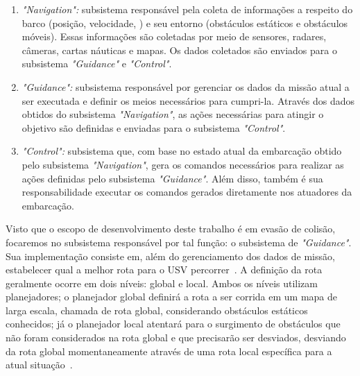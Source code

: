         \begin{enumerate}
            \item \textit{"Navigation":} subsistema responsável pela coleta de informações a respeito do barco (posição, velocidade, \etc) e seu entorno (obstáculos estáticos e obstáculos móveis). Essas informações são coletadas por meio de sensores, radares, câmeras, cartas náuticas e mapas. Os dados coletados são enviados para o subsistema \textit{"Guidance"} e \textit{"Control"}.
            
            \item \textit{"Guidance":} subsistema responsável por gerenciar os dados da missão atual a ser executada e definir os meios necessários para cumpri-la. Através dos dados obtidos do subsistema \textit{"Navigation"}, as ações necessárias para atingir o objetivo são definidas e enviadas para o subsistema \textit{"Control"}.
            
            \item \textit{"Control":} subsistema que, com base no estado atual da embarcação obtido pelo subsistema \textit{"Navigation"}, gera os comandos necessários para realizar as ações definidas pelo subsistema \textit{"Guidance"}. Além disso, também é sua responsabilidade executar os comandos gerados diretamente nos atuadores da embarcação.
        \end{enumerate}
        
        Visto que o escopo de desenvolvimento deste trabalho é em evasão de colisão, focaremos no subsistema responsável por tal função: o subsistema de \textit{"Guidance"}. Sua implementação consiste em, além do gerenciamento dos dados de missão, estabelecer qual a melhor rota para o USV percorrer~\cite{Jurak2020COLREGS}. A definição da rota geralmente ocorre em dois níveis: global e local. Ambos os níveis utilizam planejadores; o planejador global definirá a rota a ser corrida em um mapa de larga escala, chamada de rota global, considerando obstáculos estáticos conhecidos; já o planejador local atentará para o surgimento de obstáculos que não foram considerados na rota global e que precisarão ser desviados, desviando da rota global momentaneamente através de uma rota local específica para a atual situação~\cite{Liu2016Unmanned}.
    
